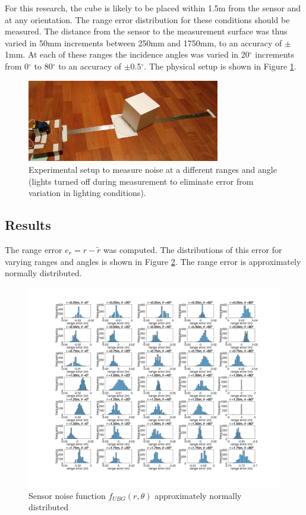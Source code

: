 	For this research, the cube is likely to be placed within 1.5m from the sensor and at any orientation. The range error distribution for these conditions should be measured. The distance from the sensor to the measurement surface was thus varied in 50mm increments between 250mm and 1750mm, to an accuracy of $\pm$1mm. At each of these ranges the incidence angles was varied in 20$^\circ$ increments from 0$^\circ$ to 80$^\circ$ to an accuracy of $\pm$0.5$^\circ$. The physical setup is shown in Figure \ref{fig:noise_setup}.
	
	\begin{figure}
	\centering
	 	\includegraphics[width=0.75\textwidth,trim = 0mm 0mm 0mm 0mm,clip=true]{./Figures/noise_setup}\vspace*{0ex}
	  	\caption{Experimental setup to measure noise at a different ranges and angle (lights turned off during measurement to eliminate error from variation in lighting conditions).} \label{fig:noise_setup}
	\end{figure}
		 
	\subsection{Results}
		The range error $e_r = r - \tilde{r}$ was computed. The distributions of this error for varying ranges and angles is shown in Figure \ref{fig:mean_hist}. The range error is approximately normally distributed.
		\begin{figure}
		\centering
		  \includegraphics[width=1\textwidth,trim = 0mm 0mm 0mm 0mm,clip]{./Figures/range_error_histograms.jpg}
		  \caption{Sensor noise function $f_{UBG}(r,\theta)$ approximately normally distributed}
		  \label{fig:mean_hist}
		\end{figure}
		
